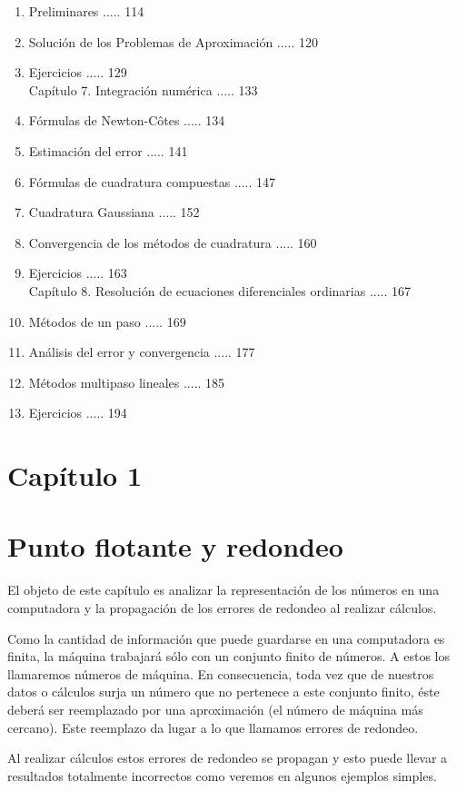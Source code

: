 \documentclass[10pt]{article}
\begin{document}
\begin{enumerate}
  \item Preliminares ..... 114
  \item Solución de los Problemas de Aproximación ..... 120
  \item Ejercicios ..... 129\\
Capítulo 7. Integración numérica ..... 133
  \item Fórmulas de Newton-Côtes ..... 134
  \item Estimación del error ..... 141
  \item Fórmulas de cuadratura compuestas ..... 147
  \item Cuadratura Gaussiana ..... 152
  \item Convergencia de los métodos de cuadratura ..... 160
  \item Ejercicios ..... 163\\
Capítulo 8. Resolución de ecuaciones diferenciales ordinarias ..... 167
  \item Métodos de un paso ..... 169
  \item Análisis del error y convergencia ..... 177
  \item Métodos multipaso lineales ..... 185
  \item Ejercicios ..... 194
\end{enumerate}

\section*{Capítulo 1}
\section*{Punto flotante y redondeo}
El objeto de este capítulo es analizar la representación de los números en una computadora y la propagación de los errores de redondeo al realizar cálculos.

Como la cantidad de información que puede guardarse en una computadora es finita, la máquina trabajará sólo con un conjunto finito de números. A estos los llamaremos números de máquina. En consecuencia, toda vez que de nuestros datos o cálculos surja un número que no pertenece a este conjunto finito, éste deberá ser reemplazado por una aproximación (el número de máquina más cercano). Este reemplazo da lugar a lo que llamamos errores de redondeo.

Al realizar cálculos estos errores de redondeo se propagan y esto puede llevar a resultados totalmente incorrectos como veremos en algunos ejemplos simples.
\end{document}

